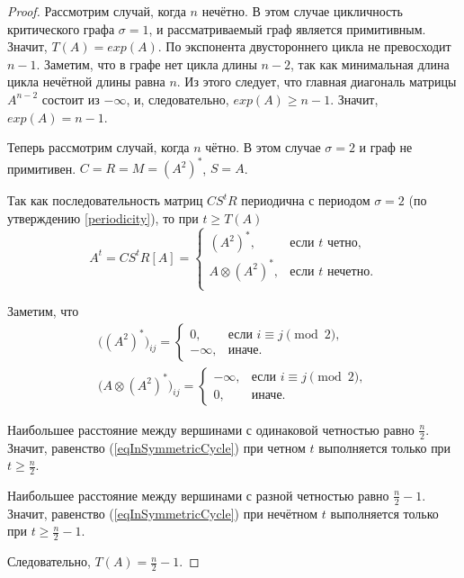 \documentclass[12pt]{article}
\theoremstyle{definition}
\begin{document}
\begin{proof}
Рассмотрим случай, когда $n$ нечётно. В этом случае цикличность критического графа $\sigma = 1$, и рассматриваемый граф является примитивным. Значит, $T(A) = exp(A)$. По \cite[теорема 3.1]{kLocalExponent} экспонента двустороннего цикла не превосходит $n - 1$. Заметим, что в графе нет цикла длины $n - 2$, так как минимальная длина цикла нечётной длины равна $n$. Из этого следует, что главная диагональ матрицы $A^{n - 2}$ состоит из $-\infty$, и, следовательно, $exp(A) \ge n - 1$. Значит, $exp(A) = n - 1$.

Теперь рассмотрим случай, когда $n$ чётно. В этом случае $\sigma = 2$ и граф не примитивен. $C = R = M = (A^2)^*$, $S = A$.

Так как последовательность матриц $CS^tR$ периодична с периодом $\sigma = 2$ (по утверждению \ref{periodicity}), то при $t \ge T(A)$ \begin{equation}
\label{eqInSymmetricCycle}
A^t = CS^tR[A] = \begin{cases}
(A^2)^*, &\text{если } t \text{ четно,}\\
A \otimes (A^2)^*, &\text{если } t \text{ нечетно.}\\
\end{cases}
\end{equation}

Заметим, что \begin{align*}
\big((A^2)^* \big)_{ij} = \begin{cases}
0, & \text{если } i \equiv j \pmod{2},  \\
-\infty, & \text{иначе.}
\end{cases} \\
\big(A \otimes (A^2)^* \big)_{ij} = \begin{cases}
-\infty, & \text{если } i \equiv j \pmod{2},  \\
0, & \text{иначе.}
\end{cases}
\end{align*}

Наибольшее расстояние между вершинами с одинаковой четностью равно $\frac{n}{2}$. Значит, равенство (\ref{eqInSymmetricCycle}) при четном $t$ выполняется только при $t \ge \frac{n}{2}$.

Наибольшее расстояние между вершинами с разной четностью равно $\frac{n}{2} - 1$. Значит, равенство (\ref{eqInSymmetricCycle}) при нечётном $t$ выполняется только при $t \ge \frac{n}{2} - 1$.

Следовательно, $T(A) = \frac{n}{2} - 1$.
\end{proof}
\end{document}
